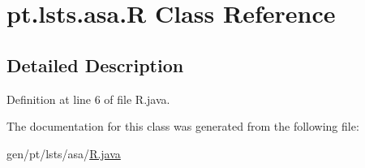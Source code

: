 \hypertarget{classpt_1_1lsts_1_1asa_1_1R}{}\section{pt.\+lsts.\+asa.\+R Class Reference}
\label{classpt_1_1lsts_1_1asa_1_1R}


\subsection{Detailed Description}


Definition at line 6 of file R.\+java.



The documentation for this class was generated from the following file\+:\begin{DoxyCompactItemize}
\item 
gen/pt/lsts/asa/\hyperlink{R_8java}{R.\+java}\end{DoxyCompactItemize}
